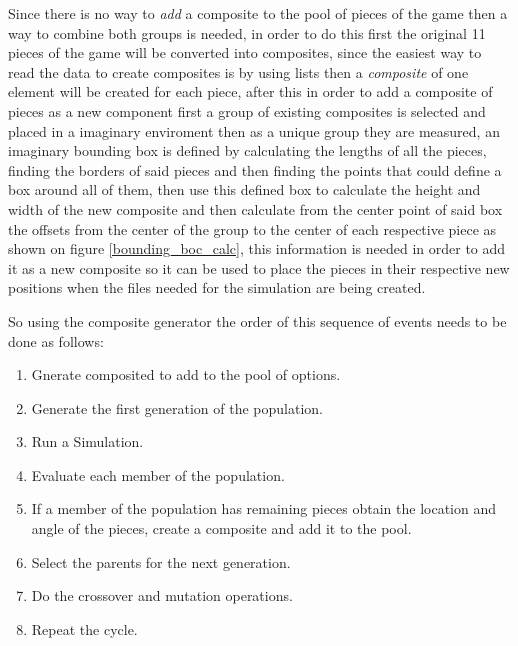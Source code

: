 \documentclass[conference]{IEEEtran}
\begin{document}
Since there is no way to \textit{add} a composite to the pool of pieces of the 
game then a way to combine both groups is needed, in order to do this first the 
original 11 pieces of the game will be converted into composites, since the easiest
way to read the data to create composites is by using lists then a \textit{composite} 
of one element will be created for each piece, after this in order to add a 
composite of pieces as a new component first a group of existing composites is 
selected and placed in a imaginary enviroment then as a unique group they are 
measured, an imaginary bounding box is defined by calculating the lengths of all
the pieces, finding the borders of said pieces and then finding the points that could
define a box around all of them, then use this defined box to calculate the 
height and width of the new composite and then calculate from 
the center point of said box the offsets from the center of the
group to the center of each respective piece as shown on figure
\ref{bounding_boc_calc}, this information is needed in order to add it as a new
composite so it can be used to place the pieces in their respective new positions
when the files needed for the simulation are being created.

So using the composite generator the order of this sequence of
events needs to be done as follows:




\begin{enumerate}
\item Gnerate composited to add to the pool of options.
\item Generate the first generation of the population.
\item Run a Simulation.
\item Evaluate each member of the population.
\item If a member of the population has remaining pieces obtain the location and
angle of the pieces, create a composite and add it to the pool.
\item Select the parents for the next generation.
\item Do the crossover and mutation operations.
\item Repeat the cycle.
\end{enumerate}
\end{document}
